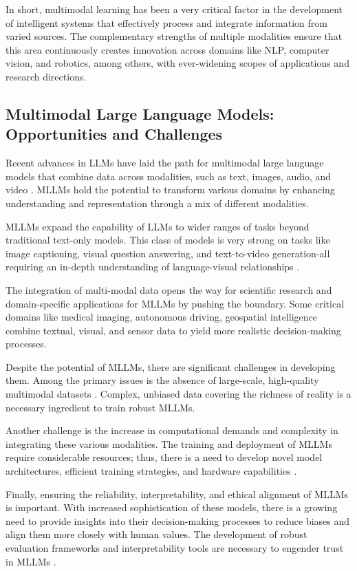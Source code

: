 \documentclass[runningheads]{llncs}
\begin{document}
In short, multimodal learning has been a very critical factor in the development of intelligent systems that effectively process and integrate information from varied sources. The complementary strengths of multiple modalities ensure that this area continuously creates innovation across domains like NLP, computer vision, and robotics, among others, with ever-widening scopes of applications and research directions.



\subsection{Multimodal Large Language Models: Opportunities and Challenges}

Recent advances in LLMs have laid the path for multimodal large language models that combine data across modalities, such as text, images, audio, and video \cite{ref3}. MLLMs hold the potential to transform various domains by enhancing understanding and representation through a mix of different modalities.

MLLMs expand the capability of LLMs to wider ranges of tasks beyond traditional text-only models. This class of models is very strong on tasks like image captioning, visual question answering, and text-to-video generation-all requiring an in-depth understanding of language-visual relationships \cite{ref5}.

The integration of multi-modal data opens the way for scientific research and domain-specific applications for MLLMs by pushing the boundary. Some critical domains like medical imaging, autonomous driving, geospatial intelligence combine textual, visual, and sensor data to yield more realistic decision-making processes.

Despite the potential of MLLMs, there are significant challenges in developing them. Among the primary issues is the absence of large-scale, high-quality multimodal datasets \cite{ref30}. Complex, unbiased data covering the richness of reality is a necessary ingredient to train robust MLLMs\cite{ref11}.

Another challenge is the increase in computational demands and complexity in integrating these various modalities. The training and deployment of MLLMs require considerable resources; thus, there is a need to develop novel model architectures, efficient training strategies, and hardware capabilities \cite{ref11}.

Finally, ensuring the reliability, interpretability, and ethical alignment of MLLMs is important. With increased sophistication of these models, there is a growing need to provide insights into their decision-making processes to reduce biases and align them more closely with human values. The development of robust evaluation frameworks and interpretability tools are necessary to engender trust in MLLMs \cite{ref32}.
\end{document}
